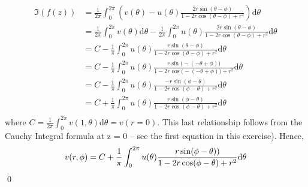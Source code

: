 \documentclass[10pt]{amsart}
\newcommand{\D}{\mathrm{d}}
\theoremstyle{nonumberplain}
\begin{document}
\begin{enumerate}[label={\bf {\arabic*}:}]
\begin{align*}
\Im (f(z)) &= \frac 1 {2\pi} \int_0^{2\pi} \left(
	v(\theta) - u(\theta)\frac{2r\sin(\theta - \phi)}{1 - 2r \cos (\theta - \phi) + r^2}
\right) \D \theta \\
	&= \frac 1 {2\pi} \int_0^{2\pi} v(\theta) \D \theta - \frac 1 {2\pi} \int_0^{2\pi} u(\theta)\frac{2r\sin(\theta - \phi)}{1 - 2r \cos (\theta - \phi) + r^2} \D \theta \\
	&= C - \frac 1 {\pi} \int_0^{2\pi} u(\theta) \frac{r\sin(\theta - \phi)}{1 - 2r \cos (\theta - \phi) + r^2} \D \theta \\
	&= C - \frac 1 {\pi} \int_0^{2\pi} u(\theta) \frac{r\sin\big(-(-\theta + \phi)\big)}{1 - 2r \cos \big(-(-\theta + \phi)\big) + r^2} \D \theta \\
	&= C - \frac 1 {\pi} \int_0^{2\pi} u(\theta) \frac{- r\sin(\phi -\theta)}{1 - 2r \cos (\phi-\theta) + r^2} \D \theta \\
	&= C + \frac 1 {\pi} \int_0^{2\pi} u(\theta) \frac{r\sin(\phi -\theta)}{1 - 2r \cos (\phi-\theta) + r^2} \D \theta \\
\end{align*}
where $C = \frac 1 {2 \pi} \int_0^{2 \pi} v(1, \theta) \D \theta = v(r = 0)$.
This last relationship follows from the Cauchy Integral formula at z = 0 -- see the first equation in this exercise).
Hence,
$$
v(r, \phi) = C + \frac 1 {\pi} \int_0^{2\pi} u(\theta) \frac{r\sin(\phi -\theta))}{1 - 2r \cos (\phi-\theta) + r^2} \D \theta \\
$$
\qed \\


\end{enumerate}
\end{document}
